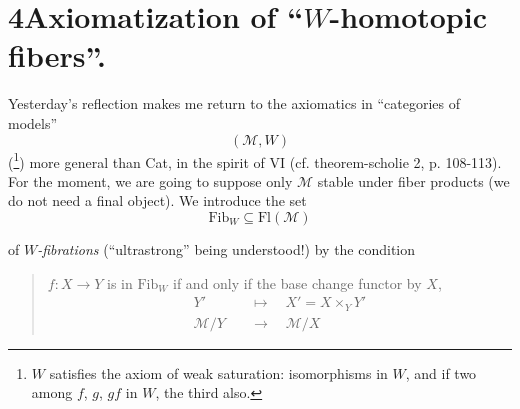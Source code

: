 \documentclass[11pt]{article}
\newcommand{\msp}[1]{\marginpar{\footnotesize [#1]}}
\begin{document}
\section*{4\quad Axiomatization of ``$W$-homotopic fibers''.}

Yesterday's reflection makes me return to the axiomatics in ``categories of models'' %
\[
(\mathcal{M}, W)
\]
(\footnote[119]{$W$ satisfies the axiom of weak saturation: isomorphisms in $W$, and if two among $f$, $g$, $gf$ in $W$, the third also.}) more general than Cat, in the spirit of VI (cf. theorem-scholie 2, p. 108-113). For the moment, we are going to suppose only $\mathcal{M}$ stable under fiber products (we do not need a final object). We introduce the set
\[
\mathrm{Fib}_W \subseteq \mathrm{Fl}(\mathcal{M})
\]

\msp{page 208}of \textit{$W$-fibrations} (``ultrastrong'' being understood!) by the condition

\begin{quote}
$f : X \longrightarrow Y$ is in $\mathrm{Fib}_W$ if and only if the base change functor by $X$,
\[
\begin{aligned}
Y' &\quad\longmapsto\quad X' = X \times_Y Y' \\
\mathcal{M}/Y &\quad\longrightarrow\quad \mathcal{M}/X
\end{aligned}
\]
\end{quote}
\end{document}
